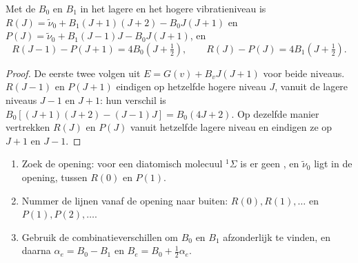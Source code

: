 \begin{theorem}[Combinatieverschillen]\label{thm:b3:rovibrational-spectroscopy:combination-differences}
Met de  $B_0$ en $B_1$ in het lagere en het hogere
vibratieniveau is $R(J) = \tilde\nu_0 + B_1(J+1)(J+2) - B_0J(J+1)$ en $P(J) = \tilde\nu_0 +
B_1(J-1)J - B_0J(J+1)$, en
\[
R(J - 1) - P(J + 1) = 4B_0(J + \tfrac12), \qquad R(J) - P(J) = 4B_1(J + \tfrac12).
\]
\end{theorem}

\begin{proof}
De eerste twee volgen uit $E = G(v) + B_vJ(J+1)$ voor beide niveaus. $R(J - 1)$ en
$P(J + 1)$ eindigen op hetzelfde hogere niveau $J$, vanuit de lagere
niveaus $J - 1$ en $J + 1$:
hun verschil is $B_0[(J+1)(J+2) - (J-1)J] = B_0(4J + 2)$. Op dezelfde manier vertrekken $R(J)$ en
$P(J)$ vanuit hetzelfde lagere niveau en eindigen ze op $J + 1$ en $J - 1$.
\end{proof}

\begin{method}\label{met:b3:rovibrational-spectroscopy:combination}
\begin{enumerate}
  \item Zoek de opening: voor een diatomisch molecuul ${}^1\Sigma$ is er
        geen , en
        $\tilde\nu_0$ ligt in de opening, tussen $R(0)$ en $P(1)$.
  \item Nummer de lijnen vanaf de opening naar buiten: $R(0), R(1), \dots$ en $P(1),
        P(2), \dots$.
  \item Gebruik de combinatieverschillen om $B_0$ en $B_1$ afzonderlijk te
        vinden, en daarna $\alpha_e = B_0 - B_1$ en $B_e = B_0 + \frac12\alpha_e$.
\end{enumerate}
\end{method}

